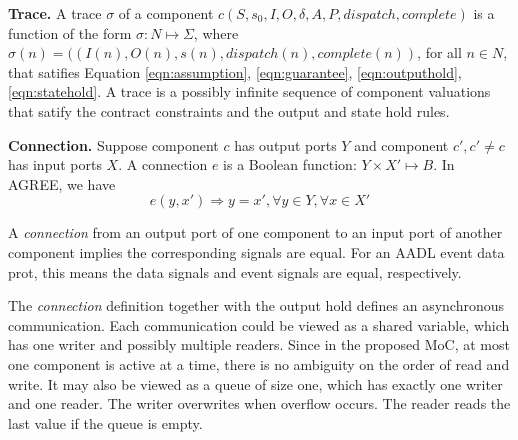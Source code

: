 {\bf Trace.}
A trace $\sigma$ of a component $c(S, s_0, I, O, \delta, A, P, dispatch, complete)$ is a function of the form $\sigma: N \mapsto \Sigma$, where
$\sigma(n) = ((I(n), O(n), s(n), dispatch(n), complete(n))$, for all $n\in N$, that satifies Equation \ref{eqn:assumption}, \ref{eqn:guarantee}, \ref{eqn:outputhold}, \ref{eqn:statehold}. %
A trace is a possibly infinite sequence of component valuations that satify the contract constraints and the output and state hold rules. 

{\bf Connection.}
Suppose component $c$ has output ports $Y$ and component $c', c' \neq c$ has input ports $X$. A connection $e$ is a Boolean function: $Y \times X' \mapsto B$. In AGREE, we have
\begin{equation} 
\label{eqn:connection}
e(y, x') \Rightarrow y = x', \forall y \in Y, \forall x \in X'
\end{equation} 

A \emph{connection} from an output port of one component to an input port of another component implies the corresponding signals are equal. For an AADL event data prot, this means the data signals and event signals are equal, respectively. 

The \emph{connection} definition together with the output hold defines an asynchronous communication. Each communication could be viewed as a shared variable, which has one writer and possibly multiple readers. Since in the proposed MoC, at most one component is active at a time, there is no ambiguity on the order of read and write. It may also be viewed as a queue of size one, which has exactly one writer and one reader. The writer overwrites when overflow occurs. The reader reads the last value if the queue is empty.


